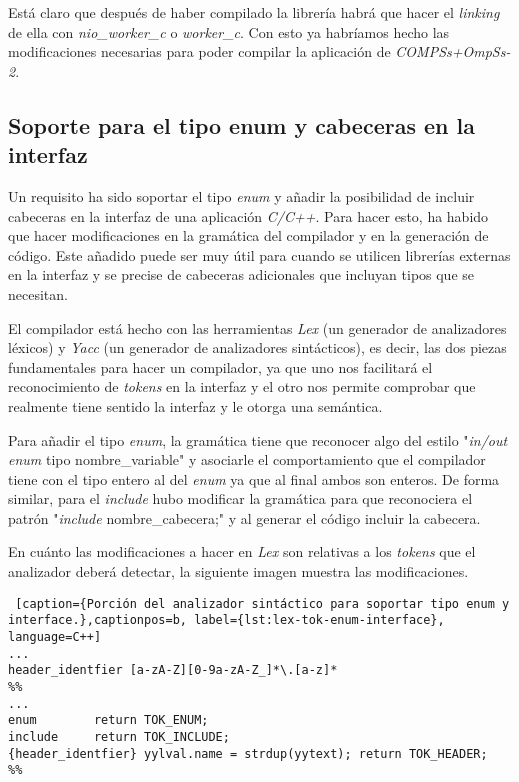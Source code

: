 \par\bigskip
Está claro que después de haber compilado la librería habrá que hacer el \textit{linking} de ella con \textit{nio\_worker\_c} o \textit{worker\_c}. Con esto ya habríamos hecho las modificaciones necesarias para poder compilar la aplicación de \textit{COMPSs+OmpSs-2}.

\subsection{Soporte para el tipo enum y cabeceras en la interfaz}

Un requisito ha sido soportar el tipo \textit{enum} y añadir la posibilidad de incluir cabeceras en la interfaz de una aplicación \textit{C/C++}. Para hacer esto, ha habido que hacer modificaciones en la gramática del compilador y en la generación de código. Este añadido puede ser muy útil para cuando se utilicen librerías externas en la interfaz y se precise de cabeceras adicionales que incluyan tipos que se necesitan.
\par\bigskip
El compilador está hecho con las herramientas \textit{Lex} (un generador de analizadores léxicos) y \textit{Yacc} (un generador de analizadores sintácticos), es decir, las dos piezas fundamentales para hacer un compilador, ya que uno nos facilitará el reconocimiento de \textit{tokens} en la interfaz y el otro nos permite comprobar que realmente tiene sentido la interfaz y le otorga una semántica.
\par\bigskip
Para añadir el tipo \textit{enum}, la gramática tiene que reconocer algo del estilo "\textit{in/out enum} tipo nombre\_variable" y asociarle el comportamiento que el compilador tiene con el tipo entero al del \textit{enum} ya que al final ambos son enteros. De forma similar, para el \textit{include} hubo modificar la gramática para que reconociera el patrón "\textit{include} nombre\_cabecera;" y al generar el código incluir la cabecera.
\par\bigskip

En cuánto las modificaciones a hacer en \textit{Lex} son relativas a los \textit{tokens} que el analizador deberá detectar, la siguiente imagen muestra las modificaciones.
\bigskip

\begin{minipage}{\linewidth}
\begin{lstlisting} [caption={Porción del analizador sintáctico para soportar tipo enum y interface.},captionpos=b, label={lst:lex-tok-enum-interface}, language=C++]
...
header_identfier [a-zA-Z][0-9a-zA-Z_]*\.[a-z]*
%%
...
enum        return TOK_ENUM;
include     return TOK_INCLUDE;
{header_identfier} yylval.name = strdup(yytext); return TOK_HEADER;
%%
\end{lstlisting}
\end{minipage}

